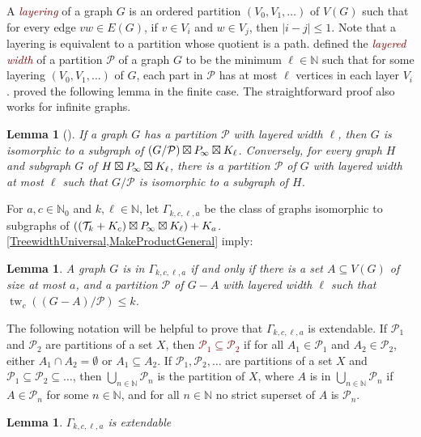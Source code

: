 \documentclass[a4paper,11pt]{article}
\newcommand{\DefNoIndex}[1]{\textcolor{Maroon}{\emph{#1}}}
\newcommand{\defn}[1]{\textcolor{Maroon}{\emph{#1}}\index{#1}}
\theoremstyle{plain}
\newtheorem{lem}[thm]{Lemma}
\theoremstyle{definition}
\renewcommand{\leq}{\leqslant}
\DeclareMathOperator{\tw}{tw}
\newcommand{\PP}{P_{\hspace{-0.25ex}\infty}}
\newcommand{\TT}{\mathcal{T}}
\newcommand{\NN}{\mathbb{N}}
\newcommand{\PART}{\mathcal{P}}
\begin{document}
A \defn{layering} of a graph $G$ is an ordered partition $(V_0,V_1,\dots)$ of $V(G)$ such that for every edge $vw\in E(G)$, if $v\in V_i$ and $w\in V_j$, then $|i-j| \leq 1$. Note that a layering is equivalent to a partition whose quotient is a path. \citet{DJMMUW20} defined the \defn{layered width} of  a partition $\PART$ of a graph $G$  to be the minimum $\ell\in\NN$ such that for some layering $(V_0,V_1,\dots)$ of $G$, each part in $\PART$ has at most $\ell$ vertices in each layer $V_i$. \citet{DJMMUW20} proved the following lemma in the finite case. The straightforward proof also works for infinite graphs.

\begin{lem}[\citep{DJMMUW20}]
\label{MakeProductGeneral}
If a graph $G$ has a partition $\PART$ with layered width $\ell$, then $G$ is isomorphic to a subgraph of $ (G/ \PART) \boxtimes \PP \boxtimes K_\ell$. Conversely, for every graph $H$ and  subgraph $G$ of $H \boxtimes \PP \boxtimes K_{\ell}$, there is a partition $\PART$ of $G$ with layered width at most $\ell$ such that $G/\PART$ is isomorphic to a subgraph of $H$. 
\end{lem}

For $a,c\in\NN_0$ and $k,\ell\in\NN$, let  $\Gamma_{k,c,\ell,a}$ be the class of graphs isomorphic to subgraphs of $( (\TT_k + K_c) \boxtimes \PP \boxtimes K_{\ell}) + K_a$. \cref{TreewidthUniversal,MakeProductGeneral} imply:

\begin{lem}
\label{ProductSubgraphLayeredWidth}
A graph $G$ is in $\Gamma_{k,c,\ell,a}$ if and only if there is a set $A\subseteq V(G)$ of size at most $a$, and a partition $\PART$ of $G-A$ with layered width $\ell$ such that $\tw_c( (G-A)/\PART) \leq k$. 
\end{lem}

The following notation will be helpful to prove that $\Gamma_{k,c,\ell,a}$ is extendable. If $\PART_1$ and $\PART_2$ are partitions of a set $X$, then \DefNoIndex{$\PART_1\subseteq \PART_2$} if for all $A_1\in\PART_1$ and $A_2\in\PART_2$, either $A_1\cap A_2=\emptyset$ or $A_1\subseteq A_2$. If $\PART_1,\PART_2,\dots$ are partitions of a set $X$ and $\PART_1\subseteq \PART_2 \subseteq\dots$, then $\bigcup_{n\in\NN} \PART_n$ is the partition of $X$, where $A$ is in $\bigcup_{n\in\NN} \PART_n$ if $A\in\PART_n$ for some $n\in\NN$, and for all $n\in\NN$ no strict superset of  $A$ is $\PART_n$. 

\begin{lem}
\label{FiniteToInfiniteGamma}
$\Gamma_{k,c,\ell,a}$ is extendable
\end{lem}
\end{document}
